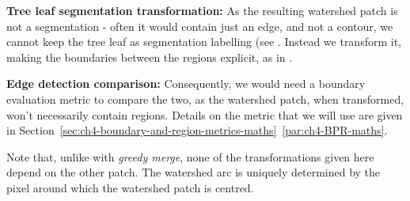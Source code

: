 \textbf{Tree leaf segmentation transformation:} As the resulting watershed patch is not a segmentation - often it would contain just an edge, and not a contour, we cannot keep the tree leaf as segmentation labelling (see . Instead we transform it, making the boundaries between the regions explicit, as in .

\textbf{Edge detection comparison:} Consequently, we would need a boundary evaluation metric to compare the two, as the watershed patch, when transformed, won't necessarily contain regions. Details on the metric that we will use are given in Section~\ref*{sec:ch4-boundary-and-region-metrics-maths}~\ref{par:ch4-BPR-maths}.

Note that, unlike with \textit{greedy merge}, none of the transformations given here depend on the other patch. The watershed arc is uniquely determined by the pixel around which the watershed patch is centred.

